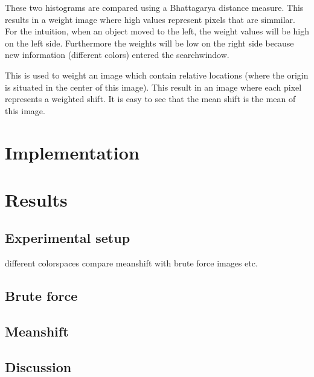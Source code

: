 \documentclass[a4paper,11pt]{article}
\begin{document}
		These two histograms are compared using a Bhattagarya distance measure. This
		results in a weight image where high values represent pixels that are
		simmilar.  For the intuition, when an object moved to the left, the weight
		values will be high on the left side. Furthermore the weights will be low on
		the right side because new information (different colors) entered the
		searchwindow. 

		This is used to weight an image which contain relative locations
		(where the origin is situated in the center of this image). This result in
		an image where each pixel represents a weighted shift. It is easy to see
		that the mean shift is the mean of this image.
	




\section{Implementation}

\section{Results} 
	\subsection{Experimental setup} 
	different colorspaces
	compare meanshift with brute force
	images etc.
	\subsection{Brute force} 
	\subsection{Meanshift} 
\subsection{Discussion} %
\end{document}
